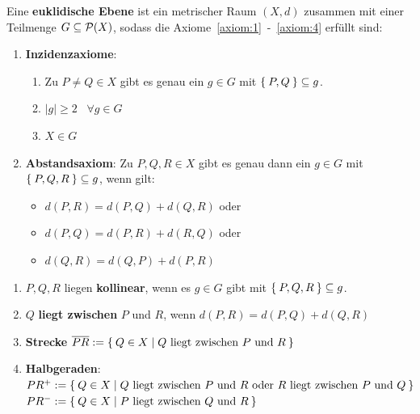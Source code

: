 \begin{definition}%
    Eine \textbf{euklidische Ebene} ist ein metrischer Raum $(X,d)$ 
    zusammen mit einer Teilmenge $G \subseteq \mathcal{P}(X)$, sodass die
    Axiome~\ref{axiom:1}~-~\ref{axiom:4} erfüllt sind:
    \begin{enumerate}[label=§\arabic*),ref=§\arabic*]
        \item \textbf{Inzidenzaxiome}:\label{axiom:1}
            \begin{enumerate}[label=(\roman*),ref=\theenumi{} (\roman*)]
                \item Zu $P \neq Q \in X$ gibt es genau ein $g \in G$ mit
                      $\Set{P, Q} \subseteq g$.
                \item $|g| \geq 2 \;\;\; \forall g \in G$
                \item $X \in G$
            \end{enumerate}
        \item \textbf{Abstandsaxiom}: Zu $P, Q, R \in X$ gibt es \label{axiom:2}
              genau dann ein $g \in G$ mit $\Set{P, Q, R} \subseteq g$,
              wenn gilt: 
              \begin{itemize}[]
                \item $d(P, R) = d(P, Q) + d(Q, R)$ oder
                \item $d(P, Q) = d(P, R) + d(R, Q)$ oder
                \item $d(Q, R) = d(Q, P) + d(P, R)$
              \end{itemize}
    \end{enumerate}
\end{definition}

\begin{definition}
    \begin{enumerate}[label=\alph*)]
        \item $P, Q, R$ liegen \textbf{kollinear}, 
              wenn es $g \in G$ gibt mit $\Set{P, Q, R} \subseteq g$.
        \item $Q$ \textbf{liegt zwischen} $P$
              und $R$, wenn $d(P, R) = d(P, Q) + d(Q, R)$
        \item \textbf{Strecke} $\overline{PR} := \Set{Q \in X | Q \text{ liegt zwischen } P \text{ und } R}$
        \item \textbf{Halbgeraden}:\\
              $PR^+ := \Set{Q \in X | Q \text{ liegt zwischen } P \text{ und } R \text{ oder } R \text{ liegt zwischen } P \text{ und } Q}$\\
              $PR^- := \Set{Q \in X | P \text{ liegt zwischen } Q \text{ und } R}$\\ 
    \end{enumerate}
\end{definition}

